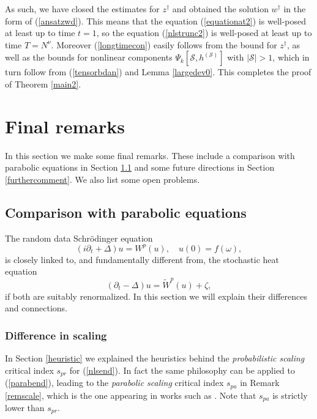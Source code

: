 \documentclass[11 pt,reqno]{amsart}
\theoremstyle{definition}
\theoremstyle{remark}
\numberwithin{equation}{section}
\newcommand{\Sc}{\mathcal{S}}
\begin{document}
{As such, we have closed the estimates for $z^\dagger$ and obtained the solution $w^\dagger$ in the form of (\ref{ansatzwd}). This means that the equation (\ref{equationat2}) is well-posed at least up to time $t=1$, so the equation (\ref{nlstrunc2}) is well-posed at least up to time $T=N^\nu$. Moreover (\ref{longtimecon}) easily follows from the bound for $z^\dagger$, as well as the bounds for nonlinear components $\Psi_k[\Sc,h^{(\Sc)}]$ with $|\Sc|>1$, which in turn follow from (\ref{tensorbdan}) and Lemma \ref{largedev0}. This completes the proof of Theorem \ref{main2}.
\section{Final remarks}\label{secfinrem} In this section we make some final remarks. These include a comparison with parabolic equations in Section \ref{comparison} and some future directions in Section \ref{furthercomment}. We also list some open problems.
\subsection{Comparison with parabolic equations}\label{comparison} The random data Schr\"{o}dinger equation
\begin{equation}\label{nlsend}(i\partial_t+\Delta)u=W^p(u),\quad u(0)=f(\omega),
\end{equation}
 is closely linked to, and fundamentally different from, the stochastic heat equation
\begin{equation}\label{parabend} (\partial_t-\Delta)u=\widetilde{W}^p(u)+\zeta,
\end{equation} if both are suitably renormalized. In this section we will explain their differences and connections.
\subsubsection{Difference in scaling}\label{comparison1} In Section \ref{heuristic} we explained the heuristics behind the \emph{probabilistic scaling} critical index $s_{pr}$ for (\ref{nlsend}). In fact the same philosophy can be applied to (\ref{parabend}), leading to the \emph{parabolic scaling} critical index $s_{pa}$ in Remark \ref{remscale}, which is the one appearing in works such as \cite{Hairer,GIP}. Note that $s_{pa}$ is strictly lower than $s_{pr}$.

}
\end{document}
